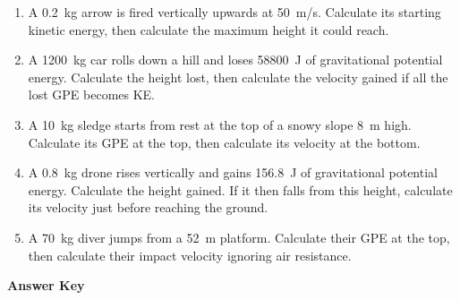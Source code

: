 \documentclass[12pt]{article}
\begin{document}
\begin{enumerate}
\item A \SI{0.2}{kg} arrow is fired vertically upwards at \SI{50}{m/s}. Calculate its starting kinetic energy, then calculate the maximum height it could reach.

\item A \SI{1200}{kg} car rolls down a hill and loses \SI{58800}{J} of gravitational potential energy. Calculate the height lost, then calculate the velocity gained if all the lost GPE becomes KE.

\item A \SI{10}{kg} sledge starts from rest at the top of a snowy slope \SI{8}{m} high. Calculate its GPE at the top, then calculate its velocity at the bottom.

\item A \SI{0.8}{kg} drone rises vertically and gains \SI{156.8}{J} of gravitational potential energy. Calculate the height gained. If it then falls from this height, calculate its velocity just before reaching the ground.

\item A \SI{70}{kg} diver jumps from a \SI{52}{m} platform. Calculate their GPE at the top, then calculate their impact velocity ignoring air resistance.

\end{enumerate}

\newpage

\begin{center}
    \Large \textbf{Answer Key}
\end{center}
\end{document}
